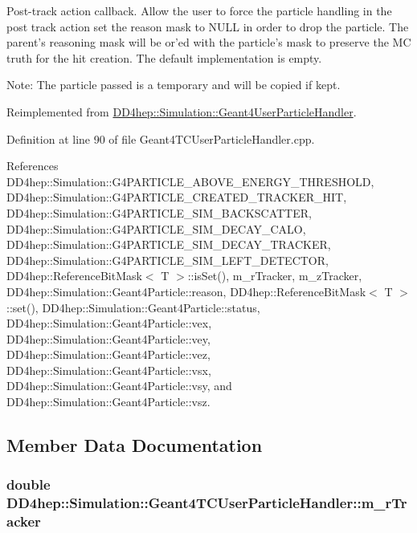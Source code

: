 Post-\/track action callback. Allow the user to force the particle handling in the post track action set the reason mask to NULL in order to drop the particle. The parent's reasoning mask will be or'ed with the particle's mask to preserve the MC truth for the hit creation. The default implementation is empty.

Note: The particle passed is a temporary and will be copied if kept. 

Reimplemented from \hyperlink{class_d_d4hep_1_1_simulation_1_1_geant4_user_particle_handler_a327d267d834a00157ebd0b1e99e1685c}{DD4hep::Simulation::Geant4UserParticleHandler}.

Definition at line 90 of file Geant4TCUserParticleHandler.cpp.

References DD4hep::Simulation::G4PARTICLE\_\-ABOVE\_\-ENERGY\_\-THRESHOLD, DD4hep::Simulation::G4PARTICLE\_\-CREATED\_\-TRACKER\_\-HIT, DD4hep::Simulation::G4PARTICLE\_\-SIM\_\-BACKSCATTER, DD4hep::Simulation::G4PARTICLE\_\-SIM\_\-DECAY\_\-CALO, DD4hep::Simulation::G4PARTICLE\_\-SIM\_\-DECAY\_\-TRACKER, DD4hep::Simulation::G4PARTICLE\_\-SIM\_\-LEFT\_\-DETECTOR, DD4hep::ReferenceBitMask$<$ T $>$::isSet(), m\_\-rTracker, m\_\-zTracker, DD4hep::Simulation::Geant4Particle::reason, DD4hep::ReferenceBitMask$<$ T $>$::set(), DD4hep::Simulation::Geant4Particle::status, DD4hep::Simulation::Geant4Particle::vex, DD4hep::Simulation::Geant4Particle::vey, DD4hep::Simulation::Geant4Particle::vez, DD4hep::Simulation::Geant4Particle::vsx, DD4hep::Simulation::Geant4Particle::vsy, and DD4hep::Simulation::Geant4Particle::vsz.

\subsection{Member Data Documentation}
\hypertarget{class_d_d4hep_1_1_simulation_1_1_geant4_t_c_user_particle_handler_a243303fc54a7945531d49aa1a0eeca7d}{
\subsubsection[{m\_\-rTracker}]{\setlength{\rightskip}{0pt plus 5cm}double {\bf DD4hep::Simulation::Geant4TCUserParticleHandler::m\_\-rTracker}}}
\label{class_d_d4hep_1_1_simulation_1_1_geant4_t_c_user_particle_handler_a243303fc54a7945531d49aa1a0eeca7d}


